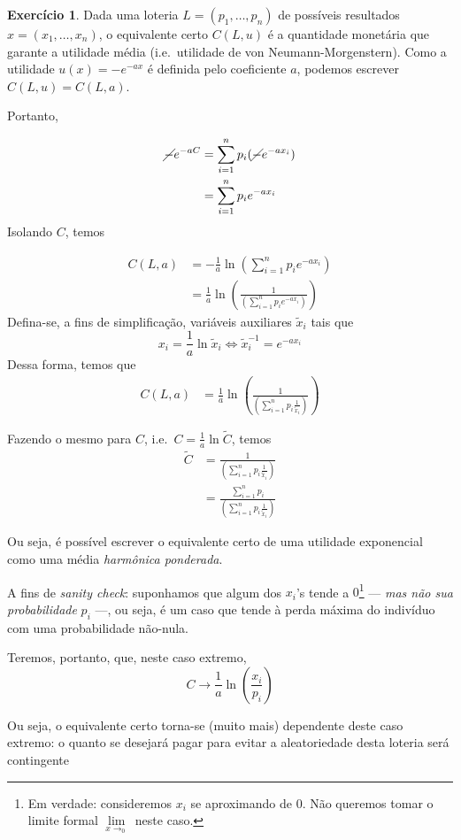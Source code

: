 \documentclass[12pt]{article}
\numberwithin{equation}{section}
\theoremstyle{plain}
\theoremstyle{definition}
\newtheorem{exercise}{Exercício}
\theoremstyle{remark}
\begin{document}
\begin{exercise}
Dada uma loteria \(L = (p_{1},\dots,p_{n})\) de possíveis resultados
\(x=(x_{1},\dots,x_{n})\), o equivalente certo \(C(L, u)\) é a
quantidade monetária que garante a utilidade média (i.e.~utilidade de
von Neumann-Morgenstern). Como a utilidade \(u(x) = - e^{-ax}\) é
definida pelo coeficiente \(a\), podemos escrever \(C(L, u) = C(L, a)\).

Portanto,

\begin{align*}
\cancel{ - }e^{-aC} &= \sum \limits_{i=1}^{n} p_{i} (\cancel{ - }e^{-ax_{i}}) \\
&= \sum \limits_{i=1}^{n} p_{i} e^{-ax_{i}}
\end{align*} Isolando \(C\), temos

\begin{align*}
C(L, a) &= -\frac{1}{a} \ln\left( \sum \limits_{i=1}^{n}p_{i} e^{-ax_{i}} \right) \\
&= \frac{1}{a}\ln \left( \frac{1}{\left( \sum \limits_{i=1}^{n}p_{i} e^{-ax_{i}} \right)} \right)
\end{align*} Defina-se, a fins de simplificação, variáveis auxiliares
\(\tilde{x}_{i}\) tais que
\[
x_{i} = \frac{1}{a} \ln \tilde{x}_{i} \iff \tilde{x}_{i}^{-1} = e^{-ax_{i}}
\]
Dessa forma, temos que \begin{align*}
C(L, a) &= \frac{1}{a}  \ln \left( \frac{1}{\left( \sum \limits_{i=1}^{n}p_{i} \frac{1}{\tilde{x}_{i}} \right)} \right) 
\end{align*}

Fazendo o mesmo para \(C\), i.e.~\(C = \frac{1}{a}\ln \tilde{C}\), temos
\begin{align*}
\tilde{C} &= \frac{1}{\left( \sum \limits_{i=1}^{n}p_{i} \frac{1}{\tilde{x}_{i}} \right)}  \\
&= \frac{\sum \limits_{i=1}^{n} p_{i}}{\left( \sum \limits_{i=1}^{n}p_{i} \frac{1}{\tilde{x}_{i}} \right)} 
\end{align*}

Ou seja, é possível escrever o equivalente certo de uma utilidade
exponencial como uma média \textit{harmônica ponderada}.

A fins de \textit{sanity check}: suponhamos que algum dos \(x_{i}\)'s
tende a \(0\)\footnote{Em verdade: consideremos \(x_{i}\) se aproximando
  de \(0\). Não queremos tomar o limite formal
  \(\lim\limits_{x\to_{0}}\) neste caso.} --- \textit{mas não sua
probabilidade} \(p_i\) ---, ou seja, é um caso que tende à perda máxima
do indivíduo com uma probabilidade não-nula.

Teremos, portanto, que, neste caso extremo,
\[
C \to \frac{1}{a}  \ln \left( \frac{x_{i}}{p_{i}}\right) 
\]

Ou seja, o equivalente certo torna-se (muito mais) dependente deste caso
extremo: o quanto se desejará pagar para evitar a aleatoriedade desta
loteria será contingente
\end{exercise}
\end{document}
